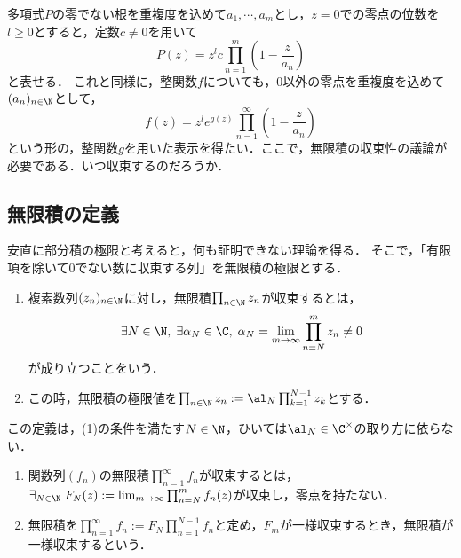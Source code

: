 \documentclass[uplatex, dvipdfmx]{jsreport}
\begin{document}
\begin{discussion}[モチベーション]
    多項式$P$の零でない根を重複度を込めて$a_1,\cdots,a_m$とし，$z=0$での零点の位数を$l\ge 0$とすると，定数$c\ne 0$を用いて
    \[P(z)=z^lc\prod_{n=1}^m(1-\frac{z}{a_n})\]
    と表せる．
    これと同様に，整関数$f$についても，$0$以外の零点を重複度を込めて$(a_n)_{n\in\N}$として，
    \[f(z)=z^le^{g(z)}\prod_{n=1}^\infty(1-\frac{z}{a_n})\]
    という形の，整関数$g$を用いた表示を得たい．ここで，無限積の収束性の議論が必要である．いつ収束するのだろうか．
\end{discussion}

\subsection{無限積の定義}

\begin{tcolorbox}[colframe=ForestGreen, colback=ForestGreen!10!white, breakable ,colbacktitle=ForestGreen!40!white, coltitle=black,fonttitle=\bfseries\sffamily,
    title=無限積という概念]
    安直に部分積の極限と考えると，何も証明できない理論を得る．
    そこで，「有限項を除いて$0$でない数に収束する列」を無限積の極限とする．
\end{tcolorbox}

\begin{definition}[複素数の無限積の収束]\mbox{}
    \begin{enumerate}
        \item 
    複素数列$(z_n)_{n\in\N}$に対し，無限積$\prod_{n\in\N}z_n$が収束するとは，
    \[\exists N\in\N,\;\exists \alpha_N\in\C,\;\alpha_N=\lim_{m\to\infty}\prod_{n=N}^mz_n\ne 0\]
    が成り立つことをいう．
        \item この時，無限積の極限値を$\prod_{n\in\N}z_n:=\al_N\prod^{N-1}_{k=1}z_k$とする．
    \end{enumerate}
\end{definition}

\begin{lemma}
    この定義は，(1)の条件を満たす$N\in\N$，ひいては$\al_N\in\C^\times$の取り方に依らない．
\end{lemma}

\begin{definition}[関数列の無限積の収束]\mbox{}
    \begin{enumerate}
        \item 関数列$(f_n)$の無限積$\prod^\infty_{n=1}f_n$が収束するとは，$\exists_{N\in\N}\;F_N(z):=\lim_{m\to\infty}\prod^m_{n=N}f_n(z)$が収束し，零点を持たない．
        \item 無限積を$\prod^\infty_{n=1}f_n:=F_N\prod^{N-1}_{n=1}f_n$と定め，$F_m$が一様収束するとき，無限積が一様収束するという．
    \end{enumerate}
\end{definition}
\end{document}
